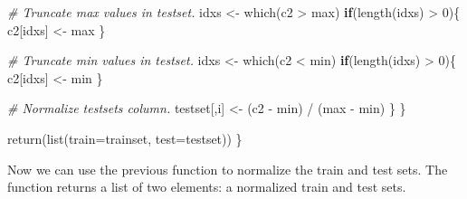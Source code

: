 \documentclass[
  11pt,
]{krantz}
\newenvironment{Shaded}{\begin{snugshade}}{\end{snugshade}}
\newcommand{\AttributeTok}[1]{\textcolor[rgb]{0.61,0.61,0.61}{#1}}
\newcommand{\CommentTok}[1]{\textcolor[rgb]{0.37,0.37,0.37}{\textit{#1}}}
\newcommand{\ControlFlowTok}[1]{\textcolor[rgb]{0.27,0.27,0.27}{\textbf{#1}}}
\newcommand{\DecValTok}[1]{\textcolor[rgb]{0.06,0.06,0.06}{#1}}
\newcommand{\FunctionTok}[1]{\textcolor[rgb]{0,0,0}{#1}}
\newcommand{\NormalTok}[1]{#1}
\newcommand{\OtherTok}[1]{\textcolor[rgb]{0.37,0.37,0.37}{#1}}
\newcommand{\SpecialCharTok}[1]{\textcolor[rgb]{0,0,0}{#1}}
\begin{document}
\begin{Shaded}
\begin{Highlighting}[]
      \CommentTok{\# Truncate max values in testset.}
\NormalTok{      idxs }\OtherTok{\textless{}{-}} \FunctionTok{which}\NormalTok{(c2 }\SpecialCharTok{\textgreater{}}\NormalTok{ max)}
      \ControlFlowTok{if}\NormalTok{(}\FunctionTok{length}\NormalTok{(idxs) }\SpecialCharTok{\textgreater{}} \DecValTok{0}\NormalTok{)\{}
\NormalTok{        c2[idxs] }\OtherTok{\textless{}{-}}\NormalTok{ max}
\NormalTok{      \}}
      
      \CommentTok{\# Truncate min values in testset.}
\NormalTok{      idxs }\OtherTok{\textless{}{-}} \FunctionTok{which}\NormalTok{(c2 }\SpecialCharTok{\textless{}}\NormalTok{ min)}
      \ControlFlowTok{if}\NormalTok{(}\FunctionTok{length}\NormalTok{(idxs) }\SpecialCharTok{\textgreater{}} \DecValTok{0}\NormalTok{)\{}
\NormalTok{        c2[idxs] }\OtherTok{\textless{}{-}}\NormalTok{ min}
\NormalTok{      \}}
      
      \CommentTok{\# Normalize testset\textquotesingle{}s column.}
\NormalTok{      testset[,i] }\OtherTok{\textless{}{-}}\NormalTok{ (c2 }\SpecialCharTok{{-}}\NormalTok{ min) }\SpecialCharTok{/}\NormalTok{ (max }\SpecialCharTok{{-}}\NormalTok{ min)}
\NormalTok{    \}}
\NormalTok{  \}}
  
  \FunctionTok{return}\NormalTok{(}\FunctionTok{list}\NormalTok{(}\AttributeTok{train=}\NormalTok{trainset, }\AttributeTok{test=}\NormalTok{testset))}
\NormalTok{\}}
\end{Highlighting}
\end{Shaded}

Now we can use the previous function to normalize the train and test sets. The function returns a list of two elements: a normalized train and test sets.
\end{document}
